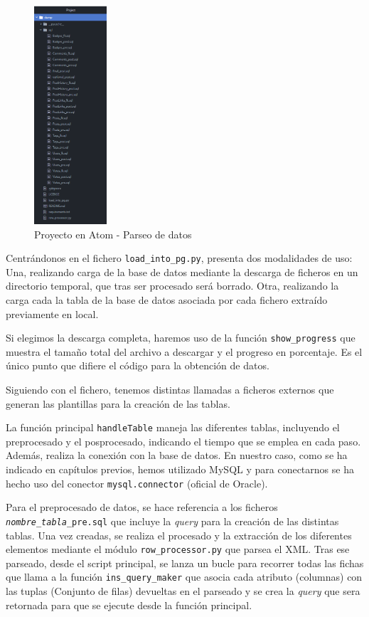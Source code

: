 \documentclass[a4paper, 12pt]{book}
\begin{document}
%
\begin{figure} %
    \centering
    \includegraphics[width=0.24\textwidth]{img/proyecto-atom.png}
    \caption{Proyecto en Atom - Parseo de datos}\label{fig:proyecto-atom}
\end{figure}

Centrándonos en el fichero \texttt{load\_into\_pg.py}, presenta dos modalidades de uso: Una, realizando carga de la base de datos mediante la descarga de ficheros en un directorio temporal, que tras ser procesado será borrado. Otra, realizando la carga cada la tabla de la base de datos asociada por cada fichero extraído previamente en local. 

Si elegimos la descarga completa, haremos uso de la función \texttt{show\_progress} que muestra el tamaño total del archivo a descargar y el progreso en porcentaje. Es el único punto que difiere el código para la obtención de datos.

Siguiendo con el fichero, tenemos distintas llamadas a ficheros externos que generan las plantillas para la creación de las tablas.

La función principal \texttt{handleTable} maneja las diferentes tablas, incluyendo el preprocesado y el posprocesado, indicando el tiempo que se emplea en cada paso. Además,  realiza la conexión con la base de datos. En nuestro caso, como se ha indicado en capítulos previos, hemos utilizado MySQL y para conectarnos se ha hecho uso del conector \texttt{mysql.connector} (oficial de Oracle).

Para el preprocesado de datos, se hace referencia a los ficheros \texttt{\emph{nombre\_tabla}\_pre.sql} que incluye la \emph{query} para la creación de las distintas tablas. Una vez creadas, se realiza el procesado y la extracción de los diferentes elementos mediante el módulo \texttt{row\_processor.py} que parsea el XML. Tras ese parseado, desde el script principal, se lanza un bucle para recorrer todas las fichas que llama a la función \texttt{ins\_query\_maker} que asocia cada atributo (columnas) con las tuplas (Conjunto de filas) devueltas en el parseado y se crea la \emph{query} que sera retornada para que se ejecute desde la función principal.
\end{document}
